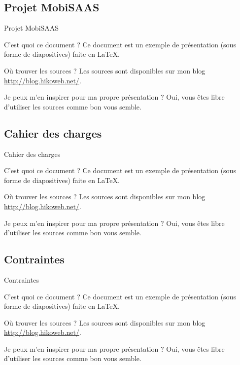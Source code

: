 \documentclass[utf8,compress]{beamer}
\begin{document}
\subsection{Projet MobiSAAS}
\begin{frame}{Projet MobiSAAS}
\begin{block}{C'est quoi ce document ?}
    Ce document est un exemple de présentation (sous forme de diapositives) faite en LaTeX.
\end{block}
\begin{block}{Où trouver les sources ?}
    Les sources sont disponibles sur mon blog \url{http://blog.hikoweb.net/}.
\end{block}
\begin{block}{Je peux m'en inspirer pour ma propre présentation ?}
    Oui, vous êtes libre d'utiliser les sources comme bon vous semble.
\end{block}
\end{frame}
\subsection{Cahier des charges}
\begin{frame}{Cahier des charges}
\begin{block}{C'est quoi ce document ?}
    Ce document est un exemple de présentation (sous forme de diapositives) faite en LaTeX.
\end{block}
\begin{block}{Où trouver les sources ?}
    Les sources sont disponibles sur mon blog \url{http://blog.hikoweb.net/}.
\end{block}
\begin{block}{Je peux m'en inspirer pour ma propre présentation ?}
    Oui, vous êtes libre d'utiliser les sources comme bon vous semble.
\end{block}
\end{frame}
\subsection{Contraintes}
\begin{frame}{Contraintes}
\begin{block}{C'est quoi ce document ?}
    Ce document est un exemple de présentation (sous forme de diapositives) faite en LaTeX.
\end{block}
\begin{block}{Où trouver les sources ?}
    Les sources sont disponibles sur mon blog \url{http://blog.hikoweb.net/}.
\end{block}
\begin{block}{Je peux m'en inspirer pour ma propre présentation ?}
    Oui, vous êtes libre d'utiliser les sources comme bon vous semble.
\end{block}
\end{frame}
\end{document}
